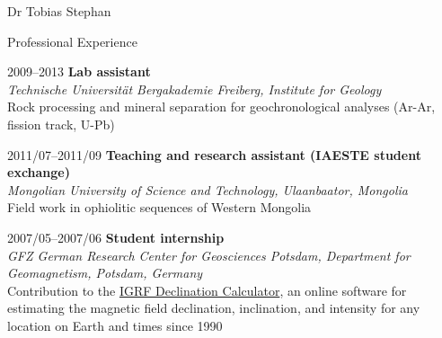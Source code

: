 \documentclass[10pt, paper=letter]{scrartcl} %
\begin{document}
\begin{cv}{Dr Tobias Stephan}
\begin{cvlist}{Professional Experience}
        \item[2009--2013] \textbf{Lab assistant}\\
        \textit{Technische Universit\"at Bergakademie Freiberg, Institute for Geology}\\ Rock processing and mineral separation for geochronological analyses (Ar\--Ar, fission track, U\--Pb)
        \item[2011/07--2011/09] \textbf{Teaching and research assistant (IAESTE student exchange)}\\
        \textit{Mongolian University of Science and Technology, Ulaanbaator, Mongolia}\\ Field work in ophiolitic sequences of Western Mongolia

        \item[2007/05--2007/06] \textbf{Student internship}\\
            \textit{GFZ German Research Center for Geosciences  Potsdam, Department for Geomagnetism, Potsdam, Germany}\\
            Contribution to the \href{http://isdc.gfz-potsdam.de/igrf-declination-calculator/}{IGRF Declination Calculator}, an online software for estimating the magnetic field declination, inclination, and intensity for any location on Earth and times since 1990
\end{cvlist}


\end{cv}
\end{document}
